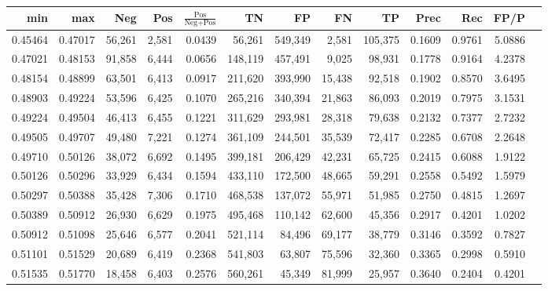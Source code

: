 \begin{tabular}{rrrrrrrrrrrrr}
\toprule
    min &     max &    Neg &   Pos & $\frac{\text{Pos}}{\text{Neg}+\text{Pos}}$ &      TN &      FP &      FN &      TP &   Prec &    Rec &   FP/P \\
\midrule
0.45464 & 0.47017 & 56,261 & 2,581 &                                     0.0439 &  56,261 & 549,349 &   2,581 & 105,375 & 0.1609 & 0.9761 & 5.0886 \\
0.47021 & 0.48153 & 91,858 & 6,444 &                                     0.0656 & 148,119 & 457,491 &   9,025 &  98,931 & 0.1778 & 0.9164 & 4.2378 \\
0.48154 & 0.48899 & 63,501 & 6,413 &                                     0.0917 & 211,620 & 393,990 &  15,438 &  92,518 & 0.1902 & 0.8570 & 3.6495 \\
0.48903 & 0.49224 & 53,596 & 6,425 &                                     0.1070 & 265,216 & 340,394 &  21,863 &  86,093 & 0.2019 & 0.7975 & 3.1531 \\
0.49224 & 0.49504 & 46,413 & 6,455 &                                     0.1221 & 311,629 & 293,981 &  28,318 &  79,638 & 0.2132 & 0.7377 & 2.7232 \\
0.49505 & 0.49707 & 49,480 & 7,221 &                                     0.1274 & 361,109 & 244,501 &  35,539 &  72,417 & 0.2285 & 0.6708 & 2.2648 \\
0.49710 & 0.50126 & 38,072 & 6,692 &                                     0.1495 & 399,181 & 206,429 &  42,231 &  65,725 & 0.2415 & 0.6088 & 1.9122 \\
0.50126 & 0.50296 & 33,929 & 6,434 &                                     0.1594 & 433,110 & 172,500 &  48,665 &  59,291 & 0.2558 & 0.5492 & 1.5979 \\
0.50297 & 0.50388 & 35,428 & 7,306 &                                     0.1710 & 468,538 & 137,072 &  55,971 &  51,985 & 0.2750 & 0.4815 & 1.2697 \\
0.50389 & 0.50912 & 26,930 & 6,629 &                                     0.1975 & 495,468 & 110,142 &  62,600 &  45,356 & 0.2917 & 0.4201 & 1.0202 \\
0.50912 & 0.51098 & 25,646 & 6,577 &                                     0.2041 & 521,114 &  84,496 &  69,177 &  38,779 & 0.3146 & 0.3592 & 0.7827 \\
0.51101 & 0.51529 & 20,689 & 6,419 &                                     0.2368 & 541,803 &  63,807 &  75,596 &  32,360 & 0.3365 & 0.2998 & 0.5910 \\
0.51535 & 0.51770 & 18,458 & 6,403 &                                     0.2576 & 560,261 &  45,349 &  81,999 &  25,957 & 0.3640 & 0.2404 & 0.4201 \\

\end{tabular}

